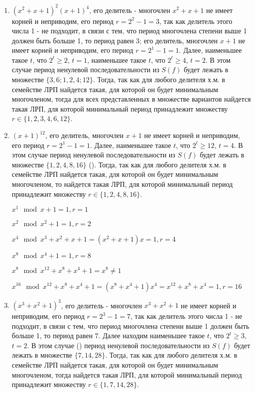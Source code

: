 \documentclass[utf8x, 14pt]{G7-32} %
\begin{document}
\begin{enumerate}
    \item $(x^2+x+1)^2(x+1)^4$, его делитель - многочлен $x^2+x+1$ не имеет корней и неприводим, его период $r = 2^2 -1 = 3$, так как делитель этого числа 1 - не подходит, в связи с тем, что период многочлена степени выше 1 должен быть больше 1, то период равен $3$; его делитель, многочлен $x+1$ не имеет корней и неприводим, его период $r = 2^1 -1 = 1$. Далее, наименьшее такое $t$, что $2^t \geq 2$, $t=1$, наименьшее такое $t$, что $2^t \geq 4$, $t=2$. В этом случае период ненулевой последовательности из $S(f)$ будет лежать в множестве $\{3, 6; 1, 2, 4; 12\}$. Тогда, так как для любого делителя х.м. в семействе ЛРП найдется такая, для которой он будет минимальным многочленом, тогда для всех представленных в множестве вариантов найдется такая ЛРП, для которой минимальный период принадлежит множеству $r \in \{1,2,3,4,6,12 \}$.
    \item $(x+1)^{12}$, его делитель, многочлен $x+1$ не имеет корней и неприводим, его период $r = 2^1 -1 = 1$. Далее, наименьшее такое $t$, что $2^t \geq 12$, $t=4$. В этом случае период ненулевой последовательности из $S(f)$ будет лежать в множестве $\{1, 2, 4, 8, 16\}$ (). Тогда, так как для любого делителя х.м. в семействе ЛРП найдется такая, для которой он будет минимальным многочленом, то найдется такая ЛРП, для которой минимальный период принадлежит множеству $r \in \{1, 2, 4, 8, 16\}$.
    
    $x^1 \mod x+1 = 1, r = 1$
    
    $x^2 \mod x^2+1 = 1, r = 2$
    
    $x^4 \mod x^3 + x^2 + x +1 = (x^2 + x + 1) x = 1, r = 4$
    
    $x^8 \mod x^4+1 = 1, r = 8$
    
    $x^8 \mod x^12 +x^8 + x^4 + 1 = x^8 \neq 1$
    
    $x^{16} \mod x^{12} +x^8 + x^4 + 1 = (x^8 + x^4 + 1) x^4 = x^{12} + x^8 + x^4 = 1, r = 16 $
    
    \item $(x^3+x^2+1)^3$, его делитель - многочлен $x^3+x^2+1$ не имеет корней и неприводим, его период $r = 2^3 -1 = 7$, так как делитель этого числа 1 - не подходит, в связи с тем, что период многочлена степени выше 1 должен быть больше 1, то период равен $7$. Далее находим наименьшее такое $t$, что $2^t \geq 3$, $t=2$. В этом случае () период ненулевой последовательности из $S(f)$ будет лежать в множестве $\{7, 14, 28\}$. Тогда, так как для любого делителя х.м. в семействе ЛРП найдется такая, для которой он будет минимальным многочленом, тогда найдется такая ЛРП, для которой минимальный период принадлежит множеству $r \in \{1, 7, 14, 28\}$. 
    

\end{enumerate}
\end{document}
